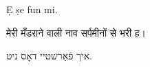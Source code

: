 \documentclass[a4paper]{article}
\begin{document}
\Large
\fchr %
Ẹ ṣe fun mi. %

\fman %
मेरी मँडराने वाली नाव सर्पमीनों से भरी ह।

\ftah %
\setRL %
איך פֿאַרשטיי דאָס ניט.
\setLR %
\end{document}
